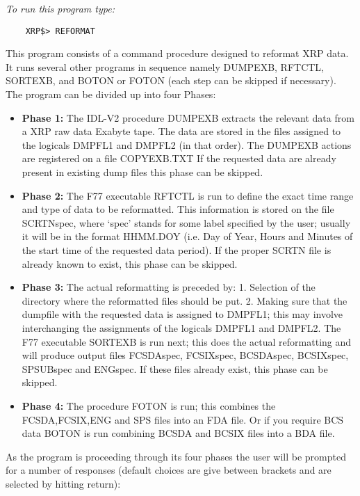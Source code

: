 {\em To run this program type:}
\begin{verbatim}
    XRP$> REFORMAT
\end{verbatim}
 This program consists of a command procedure designed to reformat XRP data.
 It runs several other programs in sequence namely DUMPEXB, RFTCTL, SORTEXB,
 and BOTON or FOTON (each step can be skipped if necessary).
 The program can be divided up into four Phases:
\begin{itemize}
\item	{\bf Phase 1: }
	The IDL-V2 procedure DUMPEXB extracts the relevant data from a XRP raw data Exabyte tape.
	The data are stored in the files assigned to the logicals DMPFL1 and DMPFL2 (in that order).
	The DUMPEXB actions are registered on a file COPYEXB.TXT
	If the requested data are already present in existing dump files this phase can be skipped.
\item	{\bf Phase 2: }
	The F77 executable RFTCTL is run to define the exact time range and type of data to be
	reformatted. This information is stored on the file SCRTNspec, where `spec' stands for some
	label specified by the user; usually it will be in the format HHMM.DOY (i.e. Day of Year, Hours
	and Minutes of the start time of the requested data period).
	If the proper SCRTN file is already known to exist, this phase can be skipped.
\item	{\bf Phase 3: }
	The actual reformatting is preceded by:
	1. Selection of the directory where the reformatted files should be put.
	2. Making sure that the dumpfile with the requested data is assigned to DMPFL1; this may involve
	   interchanging the assignments of the logicals DMPFL1 and DMPFL2.
	The F77 executable SORTEXB is run next; this does the actual reformatting and will produce output
	files FCSDAspec, FCSIXspec, BCSDAspec, BCSIXspec, SPSUBspec and ENGspec.
	If these files already exist, this phase can be skipped.
\item	{\bf Phase 4: }
	The procedure FOTON is run; this combines the FCSDA,FCSIX,ENG
        and SPS files into an FDA file. Or if you require BCS data
        BOTON is run combining BCSDA and BCSIX files into a BDA file.
\end{itemize}
        As the program is proceeding through its four phases the
	user will be prompted for a number of responses (default choices are give between brackets and
	are selected by hitting return):
